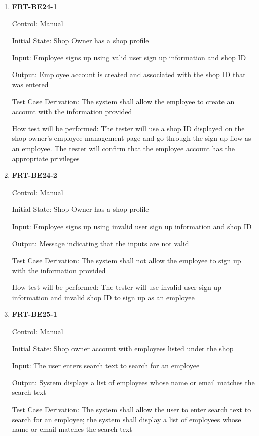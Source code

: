 \documentclass[12pt, titlepage]{article}
\begin{document}
\begin{enumerate}

	\item \textbf{FRT-BE24-1}

	      Control: Manual

	      Initial State: Shop Owner has a shop profile

	      Input: Employee signs up using valid user sign up information and shop ID

	      Output: Employee account is created and associated with the shop ID that was entered

	      Test Case Derivation: The system shall allow the employee to create an account with the information
	      provided

	      How test will be performed: The tester will use a shop ID displayed on the shop owner's employee
	      management page and go through the sign up flow as an employee. The tester will confirm that the
	      employee account has the appropriate privileges

	\item \textbf{FRT-BE24-2}

	      Control: Manual

	      Initial State: Shop Owner has a shop profile

	      Input: Employee signs up using invalid user sign up information and shop ID

	      Output: Message indicating that the inputs are not valid

	      Test Case Derivation: The system shall not allow the employee to sign up with the information
	      provided

	      How test will be performed: The tester will use invalid user sign up information and invalid shop
	      ID to sign up as an employee

	\item \textbf{FRT-BE25-1}

	      Control: Manual

	      Initial State: Shop owner account with employees listed under the shop

	      Input: The user enters search text to search for an employee

	      Output: System displays a list of employees whose name or email matches the search text

	      Test Case Derivation: The system shall allow the user to enter search text to search for an
	      employee; the system shall display a list of employees whose name or email matches the search text


\end{enumerate}
\end{document}
